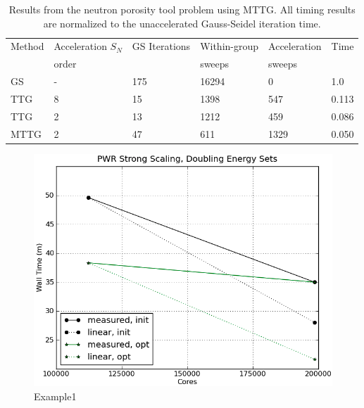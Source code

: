 \documentclass[preprint,12pt]{elsarticle}
\begin{document}

\clearpage

\begin{table}[p]
  \caption{
    Results from the neutron porosity tool problem using MTTG.  All
    timing results are normalized to the unaccelerated Gauss-Seidel
    iteration time.
  }
  \label{tab:MTTG-porosity-tool}
  \begin{center}
    \begin{tabular}{llllll}\hline\hline
      Method & Acceleration $S_N$  & GS Iterations & Within-group
      & Acceleration & Time \\
      & order & & sweeps & sweeps &  \\\hline
      GS   & - & 175 & 16294 & 0    & 1.0   \\
      TTG  & 8 & 15  & 1398  & 547  & 0.113 \\
      TTG  & 2 & 13  & 1212  & 459  & 0.086 \\
      MTTG & 2 & 47  & 611   & 1329 & 0.050 \\
      \hline\hline
    \end{tabular}
  \end{center}
\end{table}


\clearpage

\begin{figure}[p]
  \begin{center}
    \includegraphics[width=6in,clip]{PWRstrongScaling}
  \end{center}
  \caption{Example1}
  \label{fig:example1}
\end{figure}
\end{document}
